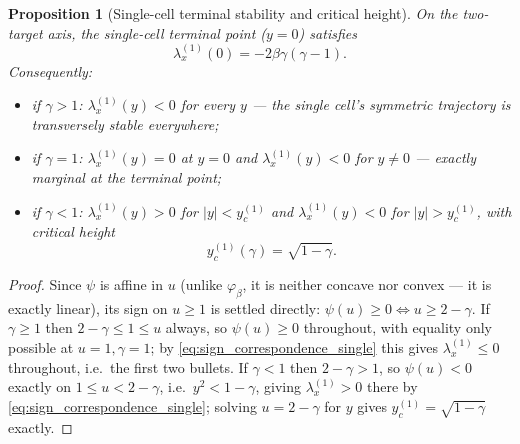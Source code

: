 \documentclass[11pt,a4paper]{article}
\theoremstyle{plain}
\newtheorem{proposition}[theorem]{Proposition}
\theoremstyle{definition}
\theoremstyle{remark}
\newcommand{\bw}{\beta}
\newcommand{\phib}{\varphi_{\bw}}
\begin{document}
\begin{proposition}[Single-cell terminal stability and critical height]
\label{prop:single_cell_critical}
On the two-target axis, the single-cell terminal point ($y=0$) satisfies
\begin{equation}
  \boxed{
  \lambda_x^{(1)}(0)=-2\bw\gamma(\gamma-1).
  }
  \label{eq:lambda_x_terminal_single}
\end{equation}
Consequently:
\begin{itemize}[leftmargin=1.4em]
\item if $\gamma>1$: $\lambda_x^{(1)}(y)<0$ for every $y$ — the single
      cell's symmetric trajectory is transversely stable everywhere;
\item if $\gamma=1$: $\lambda_x^{(1)}(y)=0$ at $y=0$ and $\lambda_x^{(1)}(y)<0$
      for $y\ne0$ — exactly marginal at the terminal point;
\item if $\gamma<1$: $\lambda_x^{(1)}(y)>0$ for $|y|<y_c^{(1)}$ and
      $\lambda_x^{(1)}(y)<0$ for $|y|>y_c^{(1)}$, with critical height
      \begin{equation}
        \boxed{y_c^{(1)}(\gamma)=\sqrt{1-\gamma}.}
        \label{eq:yc_single}
      \end{equation}
\end{itemize}
\end{proposition}
\begin{proof}
Since $\psi$ is affine in $u$ (unlike $\phib$, it is neither concave nor
convex — it is exactly linear), its sign on $u\ge1$ is settled directly:
$\psi(u)\ge0 \iff u\ge2-\gamma$. If $\gamma\ge1$ then $2-\gamma\le1\le u$
always, so $\psi(u)\ge0$ throughout, with equality only possible at
$u=1,\gamma=1$; by \eqref{eq:sign_correspondence_single} this gives
$\lambda_x^{(1)}\le0$ throughout, i.e.\ the first two bullets. If
$\gamma<1$ then $2-\gamma>1$, so $\psi(u)<0$ exactly on
$1\le u<2-\gamma$, i.e.\ $y^2<1-\gamma$, giving $\lambda_x^{(1)}>0$ there by
\eqref{eq:sign_correspondence_single}; solving $u=2-\gamma$ for $y$ gives
$y_c^{(1)}=\sqrt{1-\gamma}$ exactly.
\end{proof}
\end{document}
